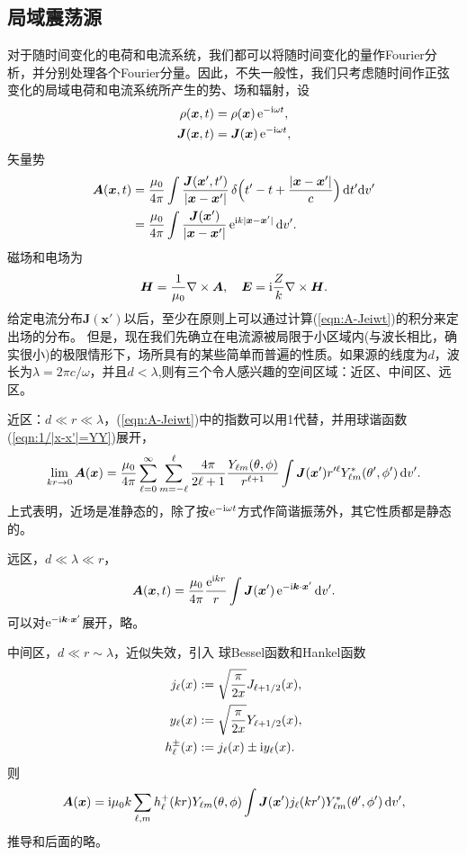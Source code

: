\subsection{局域震荡源}
对于随时间变化的电荷和电流系统，我们都可以将随时间变化的量作Fourier分析，并分别处理各个Fourier分量。因此，不失一般性，我们只考虑随时间作正弦变化的局域电荷和电流系统所产生的势、场和辐射，设
\begin{align*}
    \rho(\bm x,t)&=\rho(\bm x)\mathop{}\!\mathrm{e}^{-\mathrm{i}\omega t},\\
    \bm J(\bm x,t)&=\bm J(\bm x)\mathop{}\!\mathrm{e}^{-\mathrm{i}\omega t},
\end{align*}
矢量势
\begin{align}
    \notag
    \bm A(\bm x,t)&=\frac{\mu_0}{4\pi}\int\frac{\bm J(\bm x',t')}{|\bm x-\bm x'|}\mathop{}\!\delta\Bigl(t'-t+\frac{|\bm x-\bm x'|}c\Bigr)\mathop{}\!\mathrm{d} t'\mathrm{d} v'\\
    \label{eqn:A-Jeiwt}
    &=\frac{\mu_0}{4\pi}\int\frac{\bm J(\bm x')}{|\bm x-\bm x'|}\mathop{}\!\mathrm{e}^{\mathrm{i} k|\bm x-\bm x'|}\mathop{}\!\mathrm{d} v'.
\end{align}
磁场和电场为
\[
    \bm H=\frac1{\mu_0}\nabla\times\bm A,\quad\bm E=\mathrm{i}\frac Zk\nabla\times\bm H.
\]
给定电流分布$\bm J(\bm x')$以后，至少在原则上可以通过计算(\ref{eqn:A-Jeiwt})的积分来定出场的分布。%
但是，现在我们先确立在电流源被局限于小区域内(与波长相比，确实很小)的极限情形下，场所具有的某些简单而普遍的性质。如果源的线度为$d$，波长为$\lambda=2\pi c/\omega$，并且$d<\lambda$,则有三个令人感兴趣的空间区域：近区、中间区、远区。

近区：$d\ll r\ll\lambda$，(\ref{eqn:A-Jeiwt})中的指数可以用1代替，并用球谐函数(\ref{eqn:1/|x-x'|=YY})展开，
\[
    \lim_{kr\to0}\bm A(\bm x)=\frac{\mu_0}{4\pi}\sum_{\ell=0}^\infty\sum_{m=-\ell}^\ell\frac{4\pi}{2\ell+1}\frac{Y_{\ell m}(\theta,\phi)}{r^{\ell+1}}\int\bm J(\bm x')r'^\ell Y^\ast_{\ell m}(\theta',\phi')\mathop{}\!\mathrm{d} v'.
\]
上式表明，近场是准静态的，除了按$\mathop{}\!\mathrm{e}^{-\mathrm{i}\omega t}$方式作简谐振荡外，其它性质都是静态的。

远区，$d\ll\lambda\ll r$，
\[
    \bm A(\bm x,t)=\frac{\mu_0}{4\pi}\frac{\mathop{}\!\mathrm{e}^{\mathrm{i} kr}}r\int\bm J(\bm x')\mathop{}\!\mathrm{e}^{-\mathrm{i}\bm k\cdot\bm x'}\mathop{}\!\mathrm{d} v'.
\]
可以对$\mathop{}\!\mathrm{e}^{-\mathrm{i}\bm k\cdot\bm x'}$展开，略。

中间区，$d\ll r\sim\lambda$，近似失效，引入
球Bessel函数和Hankel函数
\begin{align}
    j_\ell(x)&:=\sqrt{\frac\pi{2x}}J_{\ell+1/2}(x),\\
    y_\ell(x)&:=\sqrt{\frac\pi{2x}}Y_{\ell+1/2}(x),\\
    h^\pm_\ell(x)&:=j_\ell(x)\pm\mathrm{i} y_\ell(x).
\end{align}
则
\[
    \bm A(\bm x)=\mathrm{i}\mu_0k\sum_{\ell,m}h_\ell^+(kr)Y_{\ell m}(\theta,\phi)\int\bm J(\bm x')j_\ell(kr')Y^\ast_{\ell m}(\theta',\phi')\mathop{}\!\mathrm{d} v',
\]
推导和后面的略。

